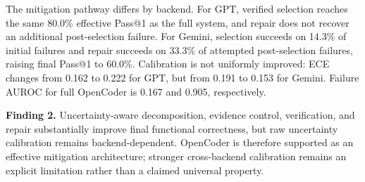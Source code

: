 The mitigation pathway differs by backend. For GPT, verified selection reaches
the same 80.0\% effective Pass@1 as the full
system, and repair does not recover an additional post-selection failure. For
Gemini, selection succeeds on 14.3\% of
initial failures and repair succeeds on 33.3\%
of attempted post-selection failures, raising final Pass@1 to
60.0\%. Calibration is not uniformly improved:
ECE changes from 0.162 to
0.222 for GPT, but from
0.191 to
0.153 for Gemini. Failure AUROC for full OpenCoder is
0.167 and 0.905, respectively.

\noindent\textbf{Finding 2.}
Uncertainty-aware decomposition, evidence control, verification, and repair
substantially improve final functional correctness, but raw uncertainty
calibration remains backend-dependent. OpenCoder is therefore supported as an
effective mitigation architecture; stronger cross-backend calibration remains
an explicit limitation rather than a claimed universal property.
